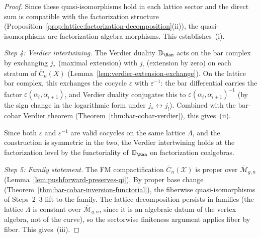 \begin{proof}
Since these quasi-isomorphisms hold in each lattice sector and the
direct sum is compatible with the factorization structure
(Proposition~\ref{prop:lattice:factorization-decomposition}(ii)),
the quasi-isomorphisms are factorization-algebra morphisms. This
establishes~(i).

\emph{Step 4: Verdier intertwining.}
The Verdier duality $\mathbb{D}_{\Ran}$ acts on the bar complex
by exchanging $j_*$ (maximal extension) with $j_!$ (extension by
zero) on each stratum of $\overline{C}_n(X)$
(Lemma~\ref{lem:verdier-extension-exchange}). On the lattice bar
complex, this exchanges the cocycle $\varepsilon$ with
$\varepsilon^{-1}$: the bar differential carries the factor
$\varepsilon(\alpha_i, \alpha_{i+1})$, and Verdier duality
conjugates this to $\varepsilon(\alpha_i, \alpha_{i+1})^{-1}$
(by the sign change in the logarithmic form under
$j_* \leftrightarrow j_!$). Combined with the bar-cobar
Verdier theorem (Theorem~\ref{thm:bar-cobar-verdier}), this
gives~(ii).

Since both $\varepsilon$ and $\varepsilon^{-1}$ are valid cocycles
on the same lattice $\Lambda$, and the construction is symmetric
in the two, the Verdier intertwining holds at the factorization
level by the functoriality of
$\mathbb{D}_{\Ran}$ on factorization coalgebras.

\emph{Step 5: Family statement.}
The FM compactification $\overline{C}_n(\mathcal{X})$ is proper over
$\overline{\mathcal{M}}_{g,n}$
(Lemma~\ref{lem:pushforward-preserves-qi}). By proper base change
(Theorem~\ref{thm:bar-cobar-inversion-functorial}), the fiberwise
quasi-isomorphisms of Steps~2--3 lift to the family. The lattice
decomposition persists in families (the lattice $\Lambda$ is
constant over $\overline{\mathcal{M}}_{g,n}$, since it is an algebraic
datum of the vertex algebra, not of the curve), so the sectorwise
finiteness argument applies fiber by fiber. This gives~(iii).
\end{proof}

